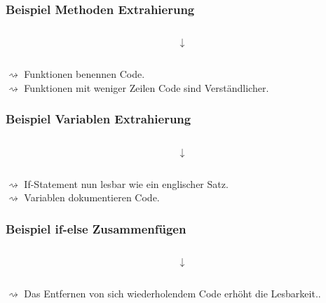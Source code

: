 \documentclass[10pt]{beamer}
\begin{document}
\begin{frame}[fragile]
  \frametitle{Beispiel Methoden Extrahierung}
  \begin{figure}[thp]
  \centering 
  \begin{minipage}{0.4\textwidth}
  \inputminted{python}{extract_method_bad.py}
  \end{minipage}
  \end{figure}
  \[\downarrow\]
  \begin{figure}[thp]
  \centering 
  \begin{minipage}{0.4\textwidth}
  \inputminted{python}{extract_method_good.py}
  \end{minipage}
  \end{figure}
  \vspace*{0.5cm}
  $\rightsquigarrow$ Funktionen benennen Code. \\
  $\rightsquigarrow$ Funktionen mit weniger Zeilen Code sind 
  Verständlicher.
\end{frame}

\begin{frame}
  \frametitle{Beispiel Variablen Extrahierung}
  \begin{figure}[thp]
  \centering 
  \begin{minipage}{0.4\textwidth}
  \inputminted{python}{extract_variable_bad.py}
  \end{minipage}
  \end{figure}
  \[\downarrow\]
  \begin{figure}[thp]
  \centering 
  \begin{minipage}{0.4\textwidth}
  \inputminted{python}{extract_variable_good.py}
  \end{minipage}
  \end{figure}
  \vspace*{0.5cm}
  $\rightsquigarrow$ If-Statement nun lesbar wie ein englischer Satz.\\
  $\rightsquigarrow$ Variablen dokumentieren Code. 
\end{frame}

\begin{frame}
  \frametitle{Beispiel if-else Zusammenfügen}
  \begin{figure}[thp]
  \centering 
  \begin{minipage}{0.4\textwidth}
  \inputminted{python}{consolidate_if_bad.py}
  \end{minipage}
  \end{figure}
  \[\downarrow\]
  \begin{figure}[thp]
  \centering 
  \begin{minipage}{0.4\textwidth}
  \inputminted{python}{consolidate_if_good.py}
  \end{minipage}
  \end{figure}
  \vspace*{0.5cm}
  $\rightsquigarrow$ Das Entfernen von sich wiederholendem Code erhöht die Lesbarkeit..\\
\end{frame}
\end{document}
